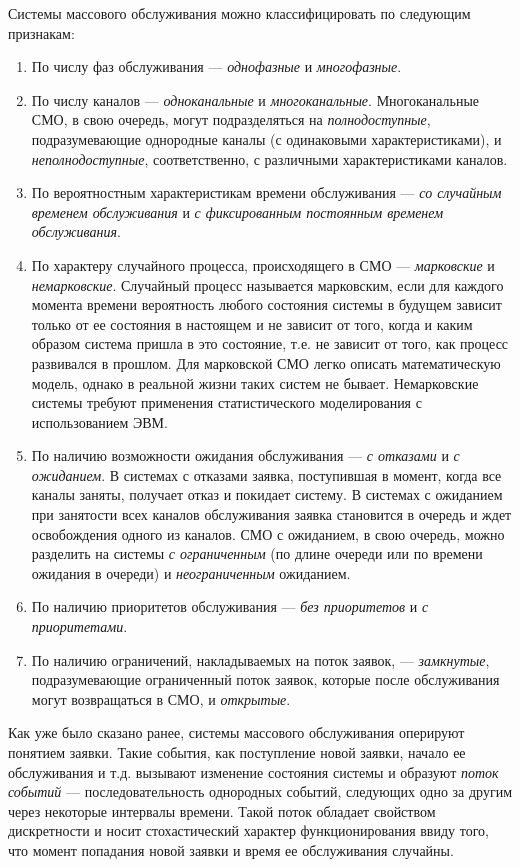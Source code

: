 Системы массового обслуживания можно классифицировать по следующим признакам:
\begin{enumerate}
	\item По числу фаз обслуживания --- \textit{однофазные} и \textit{многофазные}.
	\item По числу каналов --- \textit{одноканальные} и \textit{многоканальные}. Многоканальные СМО, в свою очередь, могут подразделяться на \textit{полнодоступные}, подразумевающие однородные каналы (с одинаковыми характеристиками), и \textit{неполнодоступные}, соответственно, с различными характеристиками каналов.
	\item По вероятностным характеристикам времени обслуживания --- \textit{со случайным временем обслуживания} и \textit{с фиксированным постоянным временем обслуживания}.
	\item По характеру случайного процесса, происходящего в СМО --- \textit{марковские} и \textit{немарковские}. Случайный процесс называется марковским, если для каждого момента времени вероятность любого состояния системы в будущем зависит только от ее состояния в настоящем и не зависит от того, когда и каким образом система пришла в это состояние, т.е. не зависит от того, как процесс развивался в прошлом. Для марковской СМО легко описать математическую модель, однако в реальной жизни таких систем не бывает. Немарковские системы требуют применения статистического моделирования с использованием ЭВМ.
	\item По наличию возможности ожидания обслуживания  --- \textit{с отказами} и \textit{с ожиданием}. В системах с отказами заявка, поступившая в момент, когда все каналы заняты, получает отказ и покидает систему. В системах с ожиданием при занятости всех каналов обслуживания заявка становится в очередь и ждет освобождения одного из каналов. СМО с ожиданием, в свою очередь, можно разделить на системы \textit{с ограниченным} (по длине очереди или по времени ожидания в очереди) и \textit{неограниченным} ожиданием.
	\item По наличию приоритетов обслуживания --- \textit{без приоритетов} и \textit{с приоритетами}.
	\item По наличию ограничений, накладываемых на поток заявок, --- \textit{замкнутые}, подразумевающие ограниченный поток заявок, которые после обслуживания могут возвращаться в СМО, и \textit{открытые}.
\end{enumerate}


Как уже было сказано ранее, системы массового обслуживания оперируют понятием заявки. Такие события, как поступление новой заявки, начало ее обслуживания и т.д. вызывают изменение состояния системы и образуют \textit{поток событий} --- последовательность однородных событий, следующих одно за другим через некоторые интервалы времени. Такой поток обладает свойством дискретности и носит стохастический характер функционирования ввиду того, что момент попадания новой заявки и время ее обслуживания случайны.

